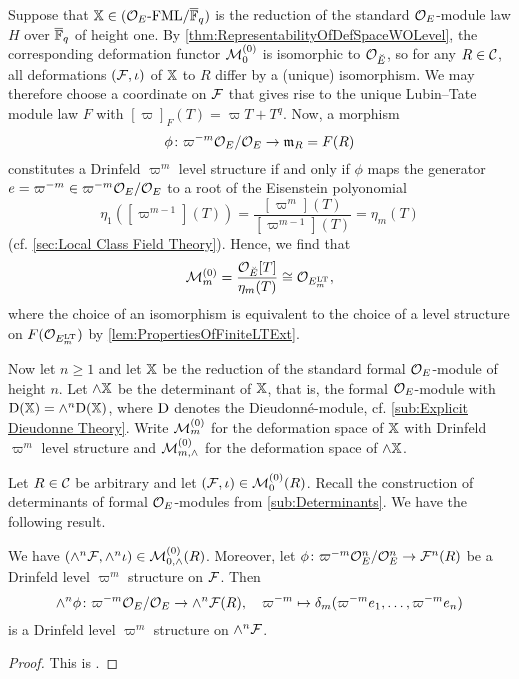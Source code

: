 \documentclass[../main.tex]{subfiles}
\begin{document}
Suppose that $\mathbb{X} \in {({\mathcal{O}_E}\textnormal-\allowbreak\mathrm{FML}/{{\overline{\mathbb{F}}_q}})}$ is the reduction of the standard
$\mathcal{O}_E$-module law $H$ over ${\overline {\mathbb{F}}_q}$ of height one. 
By \cref{thm:RepresentabilityOfDefSpaceWOLevel}, the corresponding deformation functor
$\mathcal{M}_0^{(0)}$ is isomorphic to $\mathcal{O}_{\breve {E}}$, so for any $R \in \mathcal{C}$, all deformations
$(\mathcal{F}, \iota)$ of $\mathbb{X}$ to $R$ differ by a (unique) isomorphism. We may therefore
choose a coordinate on
$\mathcal{F}$ that gives rise to the unique Lubin--Tate module law $F$ with
$[\varpi]_F(T) = \varpi T + T^q$. Now, a morphism 
\begin{equation*}
  \phi \colon \varpi^{-m}\mathcal{O}_E / \mathcal{O}_E \to \mathfrak{m}_R = F(R)
\end{equation*}
constitutes a Drinfeld $\varpi^m$ level structure if and only if 
$\phi$ maps the generator $e = \varpi^{-m} \in \varpi^{-m} \mathcal{O}_E/\mathcal{O}_E$ 
to a root of the Eisenstein polyonomial 
\begin{equation*}
  \eta_1([\varpi^{m-1}](T)) = \frac{[\varpi^m](T)}{[\varpi^{m-1}](T)} = \eta_m(T)
\end{equation*}
(cf. \cref{sec:Local Class Field Theory}). 
Hence, we find that 
\begin{equation}\label{eq:HeightOneDefSpaceIsOEm}
  \mathcal{M}_{m}^{(0)} = \frac{\mathcal{O}_{\breve {E}}[T]}{\eta_m(T)} \cong \mathcal{O}_{E_m^{\mathrm{LT}}},
\end{equation}
where the choice of an isomorphism is equivalent to the choice of a level structure 
on $F(\mathcal{O}_{E_m^{\mathrm{LT}}})$ by \cref{lem:PropertiesOfFiniteLTExt}. 

Now let $n \geq 1$ and let $\mathbb{X}$ be the reduction of the standard formal 
$\mathcal{O}_E$-module of height $n$. Let $\wedge \mathbb{X}$ be the determinant of $\mathbb{X}$,
that is, the formal $\mathcal{O}_E$-module with $\mathrm{D}(\mathbb{X}) = \wedge^n \mathrm{D}(\mathbb{X})$, where
$\mathrm{D}$ denotes the Dieudonn\'e-module, cf. \cref{sub:Explicit Dieudonne Theory}.
Write $\mathcal{M}_m^{(0)}$ for the deformation space of $\mathbb{X}$ with Drinfeld $\varpi^m$
level structure
and $\mathcal{M}_{m, \wedge}^{(0)}$ for the deformation space of $\wedge \mathbb{X}$. 

Let $R \in \mathcal{C}$ be arbitrary and let $(\mathcal{F}, \iota) \in \mathcal{M}_0^{(0)}(R)$. 
Recall the construction of determinants of formal $\mathcal{O}_E$-modules
from \cref{sub:Determinants}. We have the following result.

\begin{lem}\label{lem:DeterminantOfDrinfeldStructure}
  We have $(\wedge^n \mathcal{F}, \wedge^n \iota) \in \mathcal{M}_{0, \wedge}^{(0)}(R)$.
  Moreover,
  let $\phi\colon \varpi^{-m} \mathcal{O}_E^n/\mathcal{O}_E^n \to  \mathcal{F}^n(R)$ be a Drinfeld level
  $\varpi^m$ structure on $\mathcal{F}$. Then 
  \begin{equation*}
    \wedge^n \phi \colon \varpi^{-m} \mathcal{O}_E/\mathcal{O}_E \to \wedge^n\mathcal{F}(R), \quad 
  \varpi^{-m} \mapsto \delta_m(\varpi^{-m} e_1, \dots, \varpi^{-m} e_n)
  \end{equation*}
  is a Drinfeld level $\varpi^m$ structure on $\wedge^n \mathcal{F}$.
\begin{proof}
  This is \cite[Proposition 2.11]{weinstein2016semistable}.
\end{proof}
\end{lem}
\end{document}
